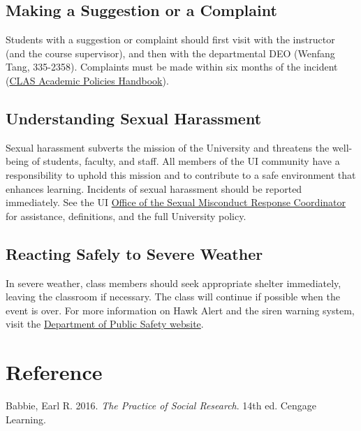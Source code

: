 \documentclass[11pt,]{article}
\theoremstyle{definition}
\theoremstyle{definition}
\theoremstyle{remark}
\begin{document}
\subsection{Making a Suggestion or a
Complaint}\label{making-a-suggestion-or-a-complaint}

Students with a suggestion or complaint should first visit with the
instructor (and the course supervisor), and then with the departmental
DEO (Wenfang Tang, 335-2358). Complaints must be made within six months
of the incident (\href{https://clas.uiowa.edu/students/handbook}{CLAS
Academic Policies Handbook}).

\subsection{Understanding Sexual
Harassment}\label{understanding-sexual-harassment}

Sexual harassment subverts the mission of the University and threatens
the well-being of students, faculty, and staff. All members of the UI
community have a responsibility to uphold this mission and to contribute
to a safe environment that enhances learning. Incidents of sexual
harassment should be reported immediately. See the UI
\href{https://osmrc.uiowa.edu/}{Office of the Sexual Misconduct Response
Coordinator} for assistance, definitions, and the full University
policy.

\subsection{Reacting Safely to Severe
Weather}\label{reacting-safely-to-severe-weather}

In severe weather, class members should seek appropriate shelter
immediately, leaving the classroom if necessary. The class will continue
if possible when the event is over. For more information on Hawk Alert
and the siren warning system, visit the
\href{https://police.uiowa.edu/emergency-communications}{Department of
Public Safety website}.

\clearpage

\section*{Reference}\label{reference}

\hypertarget{refs}{}
\hypertarget{ref-Babbie2016}{}
Babbie, Earl R. 2016. \emph{The Practice of Social Research}. 14th ed.
Cengage Learning.



\clearpage
\end{document}
